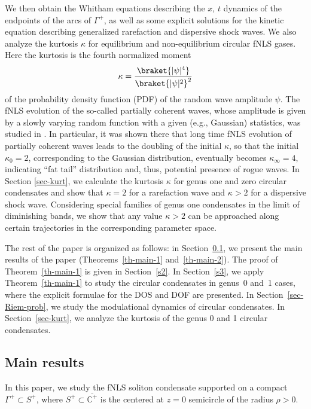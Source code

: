 \documentclass[10pt,a4paper]{amsart}
\numberwithin{equation}{section}
\newcommand{\G}{\Gamma}
\def\C{{\mathbb C}}
\def\G{\Gamma}
\begin{document}
We then obtain the Whitham equations describing the $x$, $t$ dynamics of the endpoints of the arcs of $\G^+$,
as well as some explicit solutions for
the kinetic equation describing generalized rarefaction and dispersive shock waves.
We also analyze the kurtosis $\kappa$
for equilibrium and non-equilibrium circular fNLS gases.
Here the kurtosis is the fourth
normalized moment
\begin{align*}
\kappa=\frac{\braket{|\psi|^4}}{\braket{|\psi|^2}^2}
\end{align*}
of the probability density function (PDF) of the random wave amplitude $\psi$.
The fNLS evolution of
the so-called partially coherent waves, whose amplitude is
given by a slowly varying random function with a given
(e.g., Gaussian) statistics, was studied in \cite{CERTRS}. In particular, it was shown there that long time fNLS evolution of partially coherent waves leads to the doubling of the initial $	\kappa$, so that the initial $	\kappa_0=2$, corresponding to the Gaussian distribution, eventually becomes $	\kappa_\infty=4$, indicating ``fat tail'' distribution and, thus, potential presence of rogue waves. In Section \ref{sec-kurt}, we calculate the kurtosis $\kappa$ for genus one and zero circular condensates and show that $\kappa=2$ for a rarefaction wave and $\kappa>2$ for a dispersive shock wave.
Considering special families of genus one condensates in the limit of diminishing bands, we show that
any value $\kappa>2$ can be approached along certain trajectories in the corresponding parameter space.

The rest of the paper is organized as follows: in Section~\ref{sec-Main}, we present the main results of the paper (Theorems~\ref{th-main-1} and~\ref{th-main-2}). The proof of Theorem~\ref{th-main-1} is given in Section~\ref{s2}. In Section~\ref{s3}, we apply Theorem~\ref{th-main-1} to study the circular condensates in genus~0 and~1 cases, where the explicit formulae for the DOS and DOF are presented. In Section~\ref{sec-Riem-prob}, we study the modulational dynamics of circular condensates.
In Section~\ref{sec-kurt}, we analyze the kurtosis of the genus 0 and 1 circular condensates.

\subsection{Main results}
\label{sec-Main}

In this paper, we study the fNLS soliton condensate supported on a compact $\G^+\subset S^+$, where $S^+\subset \overline{\C^+}$ is the centered at $z=0$ semicircle of the radius $\rho>0$.
\end{document}
